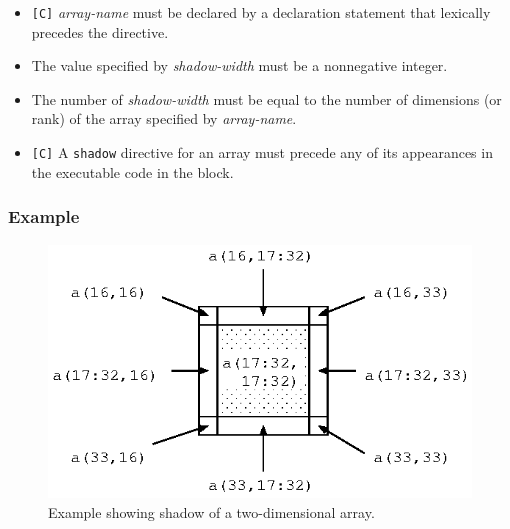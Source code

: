 \begin{itemize}
 \item \verb![C]! {\it array-name} must be declared by a declaration
       statement that lexically precedes the directive.
\item The value specified by {\it shadow-width} must be a nonnegative
      integer.
\item The number of {\it shadow-width} must be equal to the number of
      dimensions (or rank) of the array specified by {\it array-name}.
\item \verb![C]! A {\tt shadow} directive for an array must
      precede any of its appearances in the executable code in the block.
\end{itemize}

\subsubsection*{Example}

\begin{minipage}{0.5\hsize}
\begin{center}

\end{center}
\end{minipage}
%
\hspace{0.5cm}
%
\begin{minipage}{0.4\hsize} 
\begin{figure}[H]
\begin{center}
\includegraphics[width=\hsize]{figs/fig3.1.eps}
\end{center}
\caption{Example showing shadow of a two-dimensional array.}
\label{fig3.1}
\end{figure}
\end{minipage}

